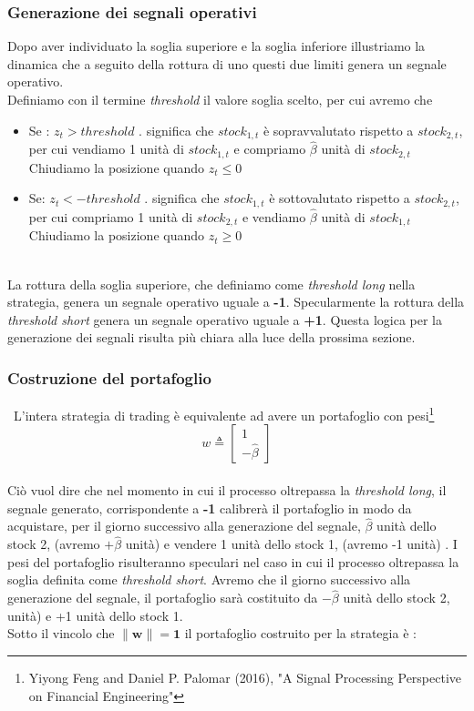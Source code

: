 \documentclass[]{article}
\begin{document}
\subsubsection{Generazione dei segnali operativi}
Dopo aver individuato la soglia superiore e la soglia inferiore illustriamo la dinamica che a seguito della rottura di uno questi due limiti genera un segnale operativo.
\\
Definiamo con il termine \textit{threshold} il valore soglia scelto, per cui avremo che 
\\
\begin{itemize}
	\item Se : \textbf{$z_t > threshold$} . significa che $stock_{1,t}$ è sopravvalutato rispetto a $stock_{2,t}$, per cui vendiamo 1 unità di $stock_{1,t}$ e compriamo $\hat{\beta}$ unità di $stock_{2,t}$
	Chiudiamo la posizione quando $z_t\leq 0$
	\item Se: \textbf{$z_t < - threshold$} . significa che $stock_{1,t}$ è sottovalutato rispetto a $stock_{2,t}$, per cui compriamo 1 unità di $stock_{2,t}$ e vendiamo $\hat{\beta}$ unità di $stock_{1,t}$
	Chiudiamo la posizione quando $z_t\geq 0$
\end{itemize}
\
\\
La rottura della soglia superiore, che definiamo come \textit{threshold long} nella strategia, genera un segnale operativo uguale a \textbf{-1}. Specularmente la rottura della \textit{threshold short} genera un segnale operativo uguale a \textbf{+1}.
Questa logica per la generazione dei segnali risulta più chiara alla luce della prossima sezione.

\subsubsection{Costruzione del portafoglio}
\
L'intera strategia di trading è equivalente ad avere un portafoglio con pesi\footnote{Yiyong Feng and Daniel P. Palomar (2016), "A Signal Processing Perspective on Financial Engineering"}
\begin{equation} 
w\triangleq 
\begin{bmatrix}
	1 \\
	-\hat{\beta}
\end{bmatrix}
\end{equation}
\
\\
Ciò vuol dire che nel momento in cui il processo oltrepassa la \textit{threshold long}, il segnale generato, corrispondente a \textbf{-1} calibrerà il portafoglio in modo da acquistare, per il giorno successivo alla generazione del segnale, $\hat{\beta}$ unità dello stock 2, (avremo $ + \hat{\beta}$ unità) e vendere 1 unità dello stock 1, (avremo -1 unità) .
I pesi del portafoglio risulteranno speculari nel caso in cui il processo oltrepassa la soglia definita come \textit{threshold short}.
Avremo che il giorno successivo alla generazione del segnale, il portafoglio sarà costituito da $- \hat{\beta}$ unità dello stock 2, unità) e +1 unità dello stock 1.
\\
Sotto il vincolo che $ \mathbf{\lVert w \rVert =1}  $ il portafoglio costruito per la strategia è :
\end{document}
